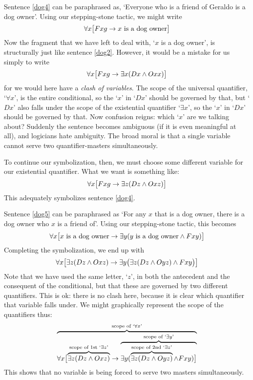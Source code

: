 Sentence \ref{dog4} can be paraphrased as, `Everyone who is a friend of Geraldo is a dog owner'. Using our stepping-stone tactic, we might write 
$$\forall x \bigl[\mathord{F}xg \rightarrow x \text{ is a dog owner}\bigr]$$
Now the fragment that we have left to deal with, `$x$ is a dog owner', is structurally just like sentence \ref{dog2}. However, it would be a mistake for us simply to write 
$$\forall x \bigl[\mathord{F}xg \rightarrow \exists x(Dx \wedge \mathord{O}xx)\bigr]$$
for we would here have a \emph{clash of variables}. The scope of the universal quantifier, `$\forall x$', is the entire conditional, so the `$x$' in `$Dx$' should be governed by that, but `$Dx$' also falls under the scope of the existential quantifier `$\exists x$', so the `$x$' in `$Dx$' should be governed by that. Now confusion reigns: which `$x$' are we talking about? Suddenly the sentence becomes ambiguous (if it is even meaningful at all), and logicians hate ambiguity. The broad moral is that a single variable cannot serve two quantifier-masters simultaneously.

To continue our symbolization, then, we must choose some different variable for our existential quantifier. What we want is something like:
$$\forall x\bigl[\mathord{F}xg \rightarrow\exists z(\mathord{D}z \wedge \mathord{O}xz)\bigr]$$
This adequately symbolizes sentence \ref{dog4}.

Sentence \ref{dog5} can be paraphrased as `For any $x$ that is a dog owner, there is a dog owner who $x$ is a friend of'. Using our stepping-stone tactic, this becomes 
$$\forall x\bigl[\mbox{$x$ is a dog owner}\rightarrow\exists y(\mbox{$y$ is a dog owner}\wedge \mathord{F}xy)\bigr]$$
Completing the symbolization, we end up with
$$\forall x\bigl[\exists z(\mathord{D}z \wedge \mathord{O}xz)\rightarrow\exists y\bigl(\exists z(\mathord{D}z \wedge \mathord{O}yz)\wedge \mathord{F}xy\bigr)\bigr]$$
Note that we have used the same letter, `$z$', in both the antecedent and the consequent of the conditional, but that these are governed by two different quantifiers. This is ok: there is no clash here, because it is clear which quantifier that variable falls under. We might graphically represent the scope of the quantifiers thus:
$$\overbrace{\forall x\bigl[\overbrace{\exists z(\mathord{D}z \wedge \mathord{O}xz)}^{\text{scope of 1st `}\exists z\text{'}}\rightarrow \overbrace{\exists y(\overbrace{\exists z(\mathord{D}z \wedge \mathord{O}yz)}^{\text{scope of 2nd `}\exists z\text{'}}\wedge \mathord{F}xy)\bigr]}^{\text{scope of `}\exists y\text{'}}}^{\text{scope of `}\forall x\text{'}}$$
This shows that no variable is being forced to serve two masters simultaneously.

